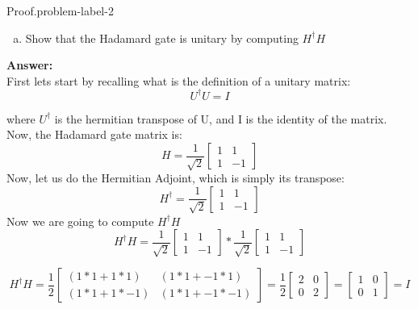 \begin{problem}{Proof.}{problem-label-2}
\begin{enumerate}[(a)]
    \item  Show that the Hadamard gate is unitary by computing $H^{\dagger} H$
\end{enumerate}
\textbf{Answer:}\\
	First lets start by recalling what is the definition of a unitary matrix:\\

\[
U^{\dagger}U = I
\]

where $U^{\dagger}$ is the hermitian transpose of U, and I is the identity of the matrix. Now, the Hadamard gate matrix is:
\[
H =\frac{1}{\sqrt{2}} 
\begin{bmatrix}
	1 & 1\\
	1 & -1
\end{bmatrix}
\]
Now, let us do the Hermitian Adjoint, which is simply its transpose:
\[
H^{\dagger}= \frac{1}{\sqrt{2}}
\begin{bmatrix}
	1 & 1\\
	1 & -1
\end{bmatrix}
\]
Now we are going to compute $H^{\dagger}H$
\[
H^{\dagger}H =
\frac{1}{\sqrt{2}}
\begin{bmatrix}
	1 & 1\\
	1 & -1
\end{bmatrix}
*
\frac{1}{\sqrt{2}}
\begin{bmatrix}
	1 & 1\\
	1 & -1
\end{bmatrix}
\]

\[
H^{\dagger}H = \frac{1}{2}
\begin{bmatrix}
	(1*1+1*1) & (1*1+-1*1)\\
	(1*1+1*-1) & (1*1+-1*-1)
\end{bmatrix}
= \frac{1}{2}
\begin{bmatrix}
	2 & 0 \\
	0 & 2
\end{bmatrix}
= 
\begin{bmatrix}
	1 & 0 \\
	0 & 1
\end{bmatrix}
= I 
\]








\end{problem}


